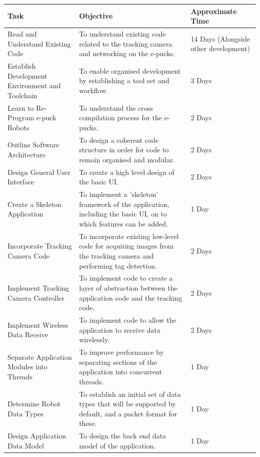 \documentclass[titlepage,hidelinks,10pt]{article}
\begin{document}
\begin{table}[H]
\begin{tabular}[h]{ |>{\raggedright}p{5cm}|>{\raggedright}p{7cm}|p{3cm}| }
  \hline
  Task & Objective & Approximate Time \\\hline
  Read and Understand Existing Code 				& To understand existing code related to the tracking camera and networking on the e-pucks. 							& 14 Days (Alongside other development)\\ \hline
  Establish Development Environment and Toolchain 	& To enable organised development by establishing a tool set and workflow. 												& 3 Days \\ \hline
  Learn to Re-Program e-puck Robots 				& To understand the cross compilation process for the e-pucks. 															& 2 Days \\ \hline
  Outline Software Architecture 					& To design a coherent code structure in order for code to remain organised and modular. 								& 2 Days \\ \hline
  Design General User Interface 					& To create a high level design of the basic UI. 																		& 2 Days \\ \hline
  Create a Skeleton Application 					& To implement a 'skeleton' framework of the application, including the basic UI, on to which features can be added. 	& 1 Day \\ \hline
  Incorporate Tracking Camera Code 					& To incorporate existing low-level code for acquiring images from the tracking camera and performing tag detection. 	& 2 Days \\ \hline
  Implement Tracking Camera Controller 				& To implement code to create a layer of abstraction between the application code and the tracking code. 				& 2 Days \\ \hline
  Implement Wireless Data Receive 					& To implement code to allow the application to receive data wirelessly. 												& 2 Days \\ \hline
  Separate Application Modules into Threads 		& To improve performance by separating sections of the application into concurrent threads. 							& 1 Day \\ \hline
  Determine Robot Data Types 						& To establish an initial set of data types that will be supported by default, and a packet format for these. 			& 1 Day \\ \hline
  Design Application Data Model 					& To design the back end data model of the application. 																& 1 Day \\ \hline

\end{tabular}
\end{table}
\end{document}
